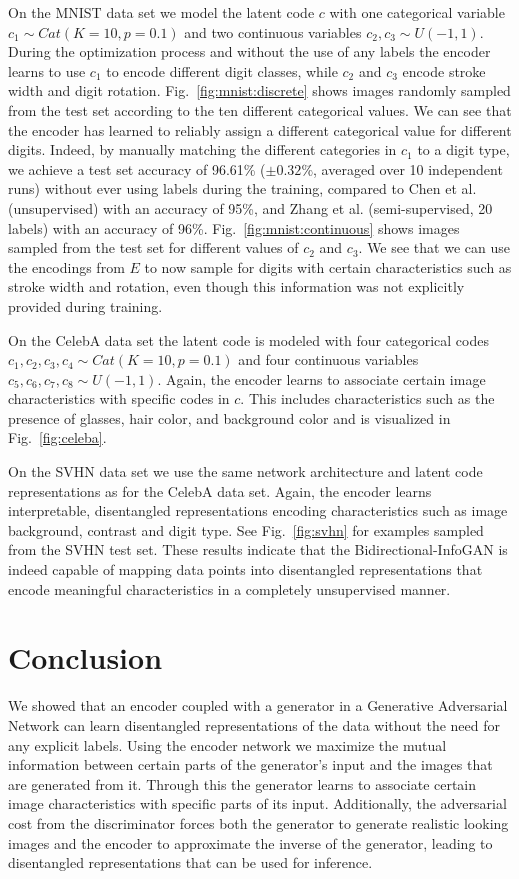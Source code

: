 \documentclass{esannV2}
\begin{document}
On the MNIST data set we model the latent code $c$ with one categorical variable $c_1\sim Cat(K=10, p=0.1)$ and two continuous variables $c_2, c_3\sim U(-1,1)$. During the optimization process and without the use of any labels the encoder learns to use $c_1$ to encode different digit classes, while $c_2$ and $c_3$ encode stroke width and digit rotation. Fig.~\ref{fig:mnist:discrete} shows images randomly sampled from the test set according to the ten different categorical values. We can see that the encoder has learned to reliably assign a different categorical value for different digits. Indeed, by manually matching the different categories in $c_1$ to a digit type, we achieve a test set accuracy of 96.61\% ($\pm 0.32\%$, averaged over 10 independent runs)  without ever using labels during the training, compared to Chen et al. \cite{Chen2016} (unsupervised) with an accuracy of 95\%, and Zhang et al. \cite{Zhang2017} (semi-supervised, 20 labels) with an accuracy of 96\%. Fig.~\ref{fig:mnist:continuous} shows images sampled from the test set for different values of $c_2$ and $c_3$. We see that we can use the encodings from $E$ to now sample for digits with certain characteristics such as stroke width and rotation, even though this information was not explicitly provided during training.

On the CelebA data set the latent code is modeled with four categorical codes $c_1, c_2, c_3, c_4\sim Cat(K=10, p=0.1)$ and four continuous variables $c_5, c_6, c_7, c_8\sim U(-1,1)$. Again, the encoder learns to associate certain image characteristics with specific codes in $c$. This includes characteristics such as the presence of glasses, hair color, and background color and is visualized in Fig.~\ref{fig:celeba}.

On the SVHN data set we use the same network architecture and latent code representations as for the CelebA data set. Again, the encoder learns interpretable, disentangled representations encoding characteristics such as image background, contrast and digit type. See Fig.~\ref{fig:svhn} for examples sampled from the SVHN test set. These results indicate that the Bidirectional-InfoGAN is indeed capable of mapping data points into disentangled representations that encode meaningful characteristics in a completely unsupervised manner.

\section{Conclusion}
We showed that an encoder coupled with a generator in a Generative Adversarial Network can learn disentangled representations of the data without the need for any explicit labels. Using the encoder network we maximize the mutual information between certain parts of the generator's input and the images that are generated from it. Through this the generator learns to associate certain image characteristics with specific parts of its input. Additionally, the adversarial cost from the discriminator forces both the generator to generate realistic looking images and the encoder to approximate the inverse of the generator, leading to disentangled representations that can be used for inference.
\end{document}
